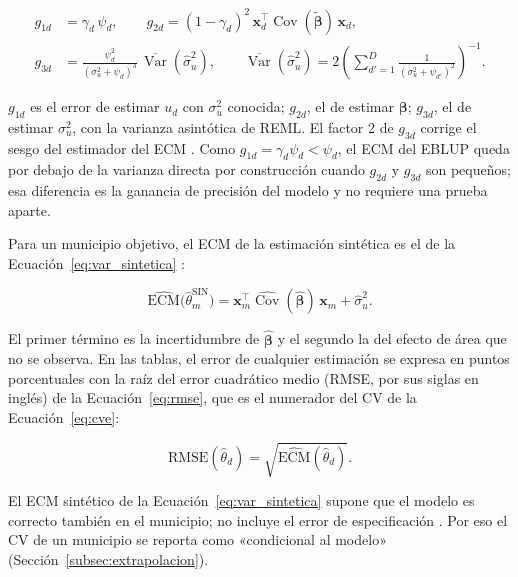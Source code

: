 \begin{equation}
\begin{aligned}
    g_{1d} &= \gamma_d\,\psi_d, \qquad
    g_{2d} = (1-\gamma_d)^2\, \mathbf{x}_d^\top \operatorname{Cov}(\tilde{\boldsymbol{\beta}})\, \mathbf{x}_d, \\
    g_{3d} &= \frac{\psi_d^2}{(\sigma_u^2+\psi_d)^3}\,\overline{\operatorname{Var}}(\hat{\sigma}_u^2), \qquad
    \overline{\operatorname{Var}}(\hat{\sigma}_u^2) = 2\left(\sum_{d'=1}^{D}\frac{1}{(\sigma_u^2+\psi_{d'})^2}\right)^{-1}.
\end{aligned}
\label{eq:ecm_componentes}
\end{equation}

$g_{1d}$ es el error de estimar $u_d$ con $\sigma_u^2$ conocida; $g_{2d}$, el de estimar $\boldsymbol{\beta}$; $g_{3d}$, el de estimar $\sigma_u^2$, con la varianza asintótica de REML. El factor 2 de $g_{3d}$ corrige el sesgo del estimador del ECM \cite[p.~441]{morales2021smallarea}. Como $g_{1d} = \gamma_d \psi_d < \psi_d$, el ECM del EBLUP queda por debajo de la varianza directa por construcción cuando $g_{2d}$ y $g_{3d}$ son pequeños; esa diferencia es la ganancia de precisión del modelo y no requiere una prueba aparte.

Para un municipio objetivo, el ECM de la estimación sintética es el de la Ecuación~\ref{eq:var_sintetica} \cite[pp.~441--442]{morales2021smallarea}:

\begin{equation}
    \widehat{\text{ECM}}\big(\hat{\theta}_m^{\text{SIN}}\big) = \mathbf{x}_m^\top \widehat{\operatorname{Cov}}(\hat{\boldsymbol{\beta}})\, \mathbf{x}_m + \hat{\sigma}_u^2 .
    \label{eq:var_sintetica}
\end{equation}

El primer término es la incertidumbre de $\hat{\boldsymbol{\beta}}$ y el segundo la del efecto de área que no se observa. En las tablas, el error de cualquier estimación se expresa en puntos porcentuales con la raíz del error cuadrático medio (RMSE, por sus siglas en inglés) de la Ecuación~\ref{eq:rmse}, que es el numerador del CV de la Ecuación~\ref{eq:cve}:

\begin{equation}
    \text{RMSE}(\hat{\theta}_d) = \sqrt{\widehat{\text{ECM}}(\hat{\theta}_d)} .
    \label{eq:rmse}
\end{equation}

El ECM sintético de la Ecuación~\ref{eq:var_sintetica} supone que el modelo es correcto también en el municipio; no incluye el error de especificación \cite[pp.~38--39]{Molina2019}. Por eso el CV de un municipio se reporta como «condicional al modelo» (Sección~\ref{subsec:extrapolacion}).

